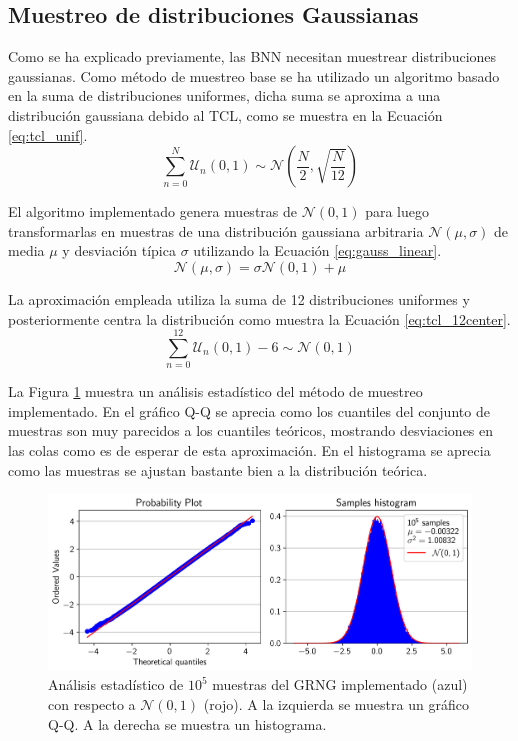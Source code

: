 \subsection{Muestreo de distribuciones Gaussianas}

Como se ha explicado previamente, las BNN necesitan muestrear distribuciones gaussianas. Como método de muestreo base se ha utilizado un algoritmo basado en la suma de distribuciones uniformes, dicha suma se aproxima a una distribución gaussiana debido al TCL, como se muestra en la Ecuación \ref{eq:tcl_unif}.
\begin{equation} \label{eq:tcl_unif}
\sum_{n=0}^{N} \mathcal{U}_n(0,1) \sim \mathcal{N} \left( \dfrac{N}{2}, \sqrt{\dfrac{N}{12}} \right)
\end{equation}

El algoritmo implementado genera muestras de $\mathcal{N}(0,1)$ para luego transformarlas en muestras de una distribución gaussiana arbitraria $\mathcal{N}(\mu, \sigma)$ de media $\mu$ y desviación típica $\sigma$ utilizando la Ecuación \ref{eq:gauss_linear}.
\begin{equation} \label{eq:gauss_linear}
\mathcal{N}(\mu, \sigma) = \sigma \mathcal{N}(0,1) + \mu
\end{equation}

La aproximación empleada utiliza la suma de 12 distribuciones uniformes y posteriormente centra la distribución como muestra la Ecuación \ref{eq:tcl_12center}.
\begin{equation} \label{eq:tcl_12center}
\sum_{n=0}^{12} \mathcal{U}_n(0,1) - 6 \sim \mathcal{N}(0,1)
\end{equation}

La Figura \ref{fig:gauss_aprox} muestra un análisis estadístico del método de muestreo implementado. En el gráfico Q-Q se aprecia como los cuantiles del conjunto de muestras son muy parecidos a los cuantiles teóricos, mostrando desviaciones en las colas como es de esperar de esta aproximación. En el histograma se aprecia como las muestras se ajustan bastante bien a la distribución teórica.

\begin{figure}[h]
	\centering
	\includegraphics[width=\textwidth]{root/Imagenes/bnn_lib/gaus_aprox.png}
	\caption{Análisis estadístico de $10^5$ muestras del GRNG implementado (azul) con respecto a $\mathcal{N}(0,1)$ (rojo). A la izquierda se muestra un gráfico Q-Q. A la derecha se muestra un histograma.}
	\label{fig:gauss_aprox}
\end{figure}

